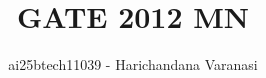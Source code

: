 \documentclass[journal]{IEEEtran}
\begin{document}

\vspace{3cm}
\title{GATE 2012 MN }
\author{ai25btech11039
- Harichandana Varanasi}
\maketitle
{\let\newpage\relax\maketitle}
{\let\newpage\relax\maketitle}
\renewcommand{\thefigure}{\theenumi}
\renewcommand{\thetable}{\theenumi}
\setlength{\intextsep}{10pt} %
\end{document}

